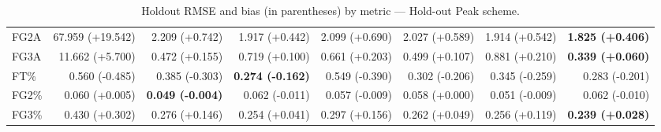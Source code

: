 \begin{table}[H]
{\begin{tabular}{lrrrrrrr}
FG2A & 67.959 (+19.542) & 2.209 (+0.742) & 1.917 (+0.442) & 2.099 (+0.690) & 2.027 (+0.589) & 1.914 (+0.542) & \textbf{1.825 (+0.406)} \\
FG3A & 11.662 (+5.700) & 0.472 (+0.155) & 0.719 (+0.100) & 0.661 (+0.203) & 0.499 (+0.107) & 0.881 (+0.210) & \textbf{0.339 (+0.060)} \\
FT\% & 0.560 (-0.485) & 0.385 (-0.303) & \textbf{0.274 (-0.162)} & 0.549 (-0.390) & 0.302 (-0.206) & 0.345 (-0.259) & 0.283 (-0.201) \\
FG2\% & 0.060 (+0.005) & \textbf{0.049 (-0.004)} & 0.062 (-0.011) & 0.057 (-0.009) & 0.058 (+0.000) & 0.051 (-0.009) & 0.062 (-0.010) \\
FG3\% & 0.430 (+0.302) & 0.276 (+0.146) & 0.254 (+0.041) & 0.297 (+0.156) & 0.262 (+0.049) & 0.256 (+0.119) & \textbf{0.239 (+0.028)} \\
\bottomrule
\end{tabular}
}
\caption{Holdout RMSE and bias (in parentheses) by metric — Hold-out Peak scheme.}
\label{tab:coverage_holdout_peak}
\end{table}

